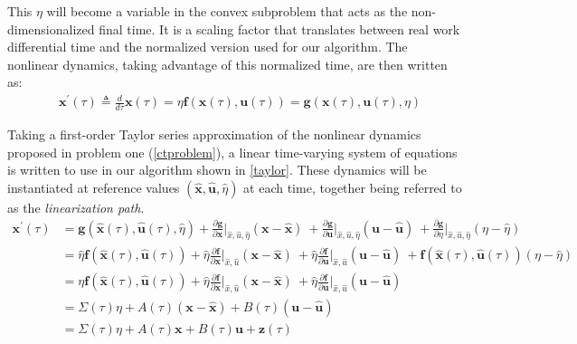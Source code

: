 This $\eta$ will become a variable in the convex subproblem that acts as the non-dimensionalized final time. It is a scaling factor that translates between real work differential time and the normalized version used for our algorithm. The nonlinear dynamics, taking advantage of this normalized time, are then written as:
\begin{align}
& \mathbf{x}^\prime(\tau) \triangleq \frac{d}{d\tau}\mathbf{x}(\tau) = \eta \mathbf{f}(\mathbf{x}(\tau), \mathbf{u}(\tau)) = \mathbf{g}(\mathbf{x}(\tau), \mathbf{u}(\tau), \eta)
\end{align}

Taking a first-order Taylor series approximation of the nonlinear dynamics proposed in problem one (\ref{ctproblem}), a linear time-varying system of equations is written to use in our algorithm shown in \ref{taylor}. These dynamics will be instantiated at reference values $(\hat{\mathbf{x}}, \hat{\mathbf{u}}, \hat{\eta})$ at each time, together being referred to as the \textit{linearization path}. 
%
\begin{subequations}
\label{taylor}
\begin{align}
\mathbf{x}^\prime(\tau) 
&= \mathbf{g}(\hat{\mathbf{x}}(\tau), \hat{\mathbf{u}}(\tau), \hat{\eta})
+ \frac{\partial \mathbf{g}}{\partial \mathbf{x}} \bigg\rvert_{\hat{x},\hat{u},\hat{\eta}} (\mathbf{x} - \hat{\mathbf{x}}) \ 
+ \frac{\partial \mathbf{g}}{\partial \mathbf{u}} \bigg\rvert_{\hat{x},\hat{u},\hat{\eta}} (\mathbf{u} - \hat{\mathbf{u}}) \ 
+ \frac{\partial \mathbf{g}}{\partial \eta} \bigg\rvert_{\hat{x},\hat{u},\hat{\eta}} (\eta - \hat{\eta}) \\
&= \hat{\eta} \mathbf{f}(\hat{\mathbf{x}}(\tau), \hat{\mathbf{u}}(\tau))
+ \hat{\eta} \frac{\partial \mathbf{f}}{\partial \mathbf{x}} \bigg\rvert_{\hat{x},\hat{u}} (\mathbf{x} - \hat{\mathbf{x}}) \
+ \hat{\eta} \frac{\partial \mathbf{f}}{\partial \mathbf{u}} \bigg\rvert_{\hat{x},\hat{u}} (\mathbf{u} - \hat{\mathbf{u}}) \
+ \mathbf{f}(\hat{\mathbf{x}}(\tau), \hat{\mathbf{u}}(\tau)) (\eta - \hat{\eta}) \\
&= {\eta} \mathbf{f}(\hat{\mathbf{x}}(\tau), \hat{\mathbf{u}}(\tau))
+ \hat{\eta} \frac{\partial \mathbf{f}}{\partial \mathbf{x}} \bigg\rvert_{\hat{x},\hat{u}} (\mathbf{x} - \hat{\mathbf{x}}) \
+ \hat{\eta} \frac{\partial \mathbf{f}}{\partial \mathbf{u}} \bigg\rvert_{\hat{x},\hat{u}} (\mathbf{u} - \hat{\mathbf{u}}) \\ 
& = \Sigma(\tau)\eta + A(\tau) (\mathbf{x} - \hat{\mathbf{x}}) + B(\tau)(\mathbf{u} - \hat{\mathbf{u}})  \\ 
&= \Sigma(\tau)\eta + A(\tau)\mathbf{x} + B(\tau)\mathbf{u} + \mathbf{z}(\tau)
\end{align}
\end{subequations}

